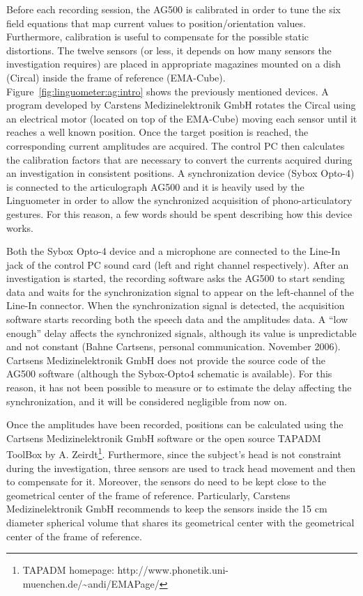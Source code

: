 Before each recording session, the AG500 is calibrated in order to
tune the six field equations that map current values to position/orientation
values.
Furthermore, calibration is useful to compensate for the possible static
distortions. 
The twelve sensors (or less, it depends on how many sensors the investigation 
requires) are placed in appropriate magazines mounted on a dish (Circal) inside
the  frame of reference (EMA-Cube).
Figure~\ref{fig:linguometer:ag:intro} shows the previously mentioned devices.
A program developed by Carstens Medizinelektronik GmbH rotates the Circal using an
electrical motor (located on top of the EMA-Cube) moving each sensor until it 
reaches a well known position.
Once the target position is reached, the corresponding current amplitudes  
are acquired. The control PC then calculates the calibration factors that are
necessary to convert the currents acquired during an
investigation in consistent positions.
A synchronization device (Sybox Opto-4) is connected to the articulograph
AG500 and
it is heavily used by the Linguometer in order to allow the synchronized 
acquisition of phono-articulatory gestures.
For this reason, a few words should be spent describing how this device works.

Both the Sybox Opto-4 device and a microphone are connected to the Line-In jack
of the control PC sound card (left and right channel respectively).
After an investigation is started, the recording software asks the AG500 to
start sending data and waits for the synchronization signal to appear on the
left-channel of the Line-In connector.
When the synchronization signal is detected, the acquisition software starts
recording both the speech data and the amplitudes data.
A ``low enough'' delay affects the synchronized signals, although its value is
unpredictable and not constant (Bahne Cartsens, personal  communication. 
November 2006).
Cartsens Medizinelektronik GmbH does not provide the source code of the AG500
software (although the Sybox-Opto4 schematic is available).
For this reason, it has not been possible to measure or to estimate the delay
affecting the synchronization, and it will be considered negligible from now on.


Once the amplitudes have been recorded, positions can be calculated using the
Cartsens Medizinelektronik GmbH software or the open source TAPADM ToolBox by A.
Zeirdt\footnote{TAPADM homepage:
http://www.phonetik.uni-muenchen.de/\~{}andi/EMAPage/}.
Furthermore, since the subject's head is not constraint during the
investigation, three sensors are used to track head movement and then to
compensate for it.
Moreover, the sensors do need to be kept close to the geometrical center of the
frame of reference.
Particularly, Carstens Medizinelektronik GmbH recommends to keep the sensors
inside the 15 cm diameter spherical volume that shares its geometrical center 
with the geometrical center of the frame of reference.
